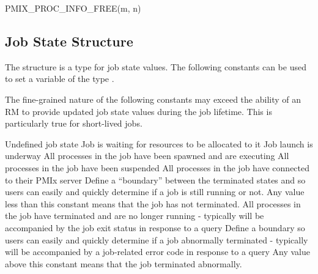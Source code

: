 \cspecificstart
\begin{codepar}
PMIX_PROC_INFO_FREE(m, n)
\end{codepar}
\cspecificend

\begin{arglist}
\end{arglist}


\subsection{Job State Structure}
\label{api:struct:jobstate}

The  structure is a  type for job state values. The following constants can be used to set a variable of the type .

\adviceuserstart
The fine-grained nature of the following constants may exceed the ability of an \ac{RM} to provide updated job state values during the job lifetime. This is particularly true for short-lived jobs.
\adviceuserend

\begin{constantdesc}
%
Undefined job state
%
Job is waiting for resources to be allocated to it
%
Job launch is underway
%
All processes in the job have been spawned and are executing
%
All processes in the job have been suspended
%
All processes in the job have connected to their \ac{PMIx} server
%
Define a ``boundary'' between the terminated states and  so users can easily and quickly determine if a job is still running or not.
Any value less than this constant means that the job has not terminated.
%
All processes in the job have terminated and are no longer running - typically will be accompanied by the job exit status in response to a query
%
Define a boundary so users can easily and quickly determine if a job abnormally terminated - typically will be accompanied by a job-related error code in response to a query
Any value above this constant means that the job terminated abnormally.
%
\end{constantdesc}


